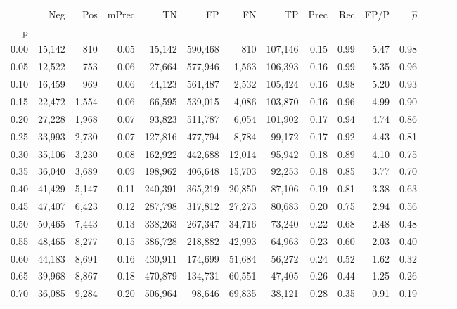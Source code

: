 \begin{tabular}{rrrrrrrrrrrrrrr}
\toprule
{} &     Neg &    Pos & mPrec &       TN &       FP &       FN &       TP &  Prec &   Rec &  FP/P & $\hat{p}$ \\
p    &         &        &       &          &          &          &          &       &       &       &           \\
\midrule
0.00 &  15,142 &    810 &  0.05 &   15,142 &  590,468 &      810 &  107,146 &  0.15 &  0.99 &  5.47 &      0.98 \\
0.05 &  12,522 &    753 &  0.06 &   27,664 &  577,946 &    1,563 &  106,393 &  0.16 &  0.99 &  5.35 &      0.96 \\
0.10 &  16,459 &    969 &  0.06 &   44,123 &  561,487 &    2,532 &  105,424 &  0.16 &  0.98 &  5.20 &      0.93 \\
0.15 &  22,472 &  1,554 &  0.06 &   66,595 &  539,015 &    4,086 &  103,870 &  0.16 &  0.96 &  4.99 &      0.90 \\
0.20 &  27,228 &  1,968 &  0.07 &   93,823 &  511,787 &    6,054 &  101,902 &  0.17 &  0.94 &  4.74 &      0.86 \\
0.25 &  33,993 &  2,730 &  0.07 &  127,816 &  477,794 &    8,784 &   99,172 &  0.17 &  0.92 &  4.43 &      0.81 \\
0.30 &  35,106 &  3,230 &  0.08 &  162,922 &  442,688 &   12,014 &   95,942 &  0.18 &  0.89 &  4.10 &      0.75 \\
0.35 &  36,040 &  3,689 &  0.09 &  198,962 &  406,648 &   15,703 &   92,253 &  0.18 &  0.85 &  3.77 &      0.70 \\
0.40 &  41,429 &  5,147 &  0.11 &  240,391 &  365,219 &   20,850 &   87,106 &  0.19 &  0.81 &  3.38 &      0.63 \\
0.45 &  47,407 &  6,423 &  0.12 &  287,798 &  317,812 &   27,273 &   80,683 &  0.20 &  0.75 &  2.94 &      0.56 \\
0.50 &  50,465 &  7,443 &  0.13 &  338,263 &  267,347 &   34,716 &   73,240 &  0.22 &  0.68 &  2.48 &      0.48 \\
0.55 &  48,465 &  8,277 &  0.15 &  386,728 &  218,882 &   42,993 &   64,963 &  0.23 &  0.60 &  2.03 &      0.40 \\
0.60 &  44,183 &  8,691 &  0.16 &  430,911 &  174,699 &   51,684 &   56,272 &  0.24 &  0.52 &  1.62 &      0.32 \\
0.65 &  39,968 &  8,867 &  0.18 &  470,879 &  134,731 &   60,551 &   47,405 &  0.26 &  0.44 &  1.25 &      0.26 \\
0.70 &  36,085 &  9,284 &  0.20 &  506,964 &   98,646 &   69,835 &   38,121 &  0.28 &  0.35 &  0.91 &      0.19 \\

\end{tabular}
